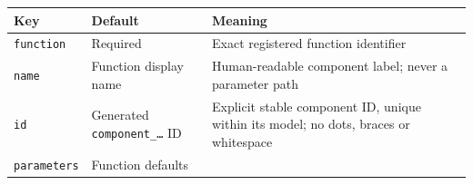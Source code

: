 \documentclass[
  10pt,
  a4paper,
  oneside]{scrreprt}
\begin{document}
\begin{longtable}[]{@{}lll@{}}
\toprule
\begin{minipage}[b]{0.30\columnwidth}\raggedright
Key\strut
\end{minipage} & \begin{minipage}[b]{0.30\columnwidth}\raggedright
Default\strut
\end{minipage} & \begin{minipage}[b]{0.30\columnwidth}\raggedright
Meaning\strut
\end{minipage}\tabularnewline
\midrule
\endhead
\begin{minipage}[t]{0.30\columnwidth}\raggedright
\texttt{function}\strut
\end{minipage} & \begin{minipage}[t]{0.30\columnwidth}\raggedright
Required\strut
\end{minipage} & \begin{minipage}[t]{0.30\columnwidth}\raggedright
Exact registered function identifier\strut
\end{minipage}\tabularnewline
\begin{minipage}[t]{0.30\columnwidth}\raggedright
\texttt{name}\strut
\end{minipage} & \begin{minipage}[t]{0.30\columnwidth}\raggedright
Function display name\strut
\end{minipage} & \begin{minipage}[t]{0.30\columnwidth}\raggedright
Human-readable component label; never a parameter path\strut
\end{minipage}\tabularnewline
\begin{minipage}[t]{0.30\columnwidth}\raggedright
\texttt{id}\strut
\end{minipage} & \begin{minipage}[t]{0.30\columnwidth}\raggedright
Generated \texttt{component\_\ldots{}} ID\strut
\end{minipage} & \begin{minipage}[t]{0.30\columnwidth}\raggedright
Explicit stable component ID, unique within its model; no dots, braces
or whitespace\strut
\end{minipage}\tabularnewline
\begin{minipage}[t]{0.30\columnwidth}\raggedright
\texttt{parameters}\strut
\end{minipage} & \begin{minipage}[t]{0.30\columnwidth}\raggedright
Function defaults\strut
\end{minipage} & \begin{minipage}[t]{0.30\columnwidth}\raggedright

\end{minipage}
\end{longtable}
\end{document}
